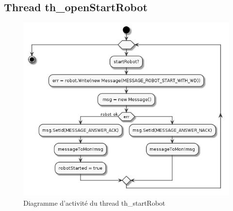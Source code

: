 \documentclass[11pt,a4paper]{paper}
\begin{document}
\subsection{Thread th\_openStartRobot}
%
 \begin{figure}[htbp]
\begin{center}
\includegraphics[scale=0.4]{figures_pdf/activity/th_startRobot}
\end{center}
\caption{Diagramme d'activité du thread th\_startRobot}
\end{figure}
\FloatBarrier
\end{document}
